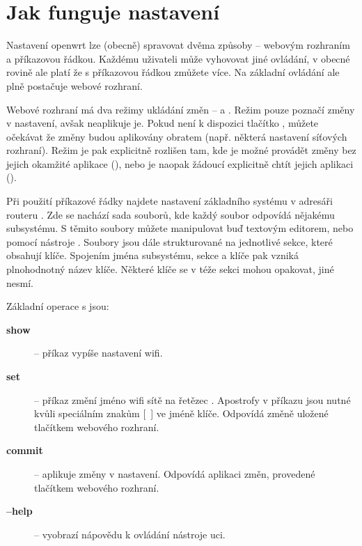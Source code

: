 \section{Jak funguje nastavení}
Nastavení \gls{openwrt} lze (obecně) spravovat dvěma způsoby -- webovým
rozhraním a příkazovou řádkou. Každému uživateli může vyhovovat jiné ovládání,
v obecné rovině ale platí že s příkazovou řádkou zmůžete více. Na základní
ovládání ale plně postačuje webové rozhraní.

Webové rozhraní má dva režimy ukládání změn --  a .
Režim  pouze poznačí změny v nastavení, avšak neaplikuje je. Pokud
není k dispozici tlačítko , můžete očekávat že změny budou
aplikovány obratem (např. některá nastavení síťových rozhraní). Režim
 je pak explicitně rozlišen tam, kde je možné provádět změny
bez jejich okamžité aplikace (), nebo je naopak žádoucí explicitně
chtít jejich aplikaci ().

Při použití příkazové řádky najdete nastavení základního systému v adresáři
routeru .
Zde se nachází sada souborů, kde každý soubor odpovídá nějakému subsystému.
S těmito soubory můžete manipulovat buď textovým editorem, nebo pomocí nástroje
. Soubory jsou dále strukturované na jednotlivé sekce, které obsahují
klíče. Spojením jména subsystému, sekce a klíče pak vzniká plnohodnotný
název klíče. Některé klíče se v téže sekci mohou opakovat, jiné nesmí.

Základní operace s  jsou:
\begin{description}
\item[\textbf{show}] -- příkaz  vypíše nastavení wifi.
\item[\textbf{set}] -- příkaz 
změní jméno wifi sítě na řetězec . Apostrofy v příkazu jsou nutné
kvůli speciálním znakům [~] ve jméně klíče. Odpovídá změně uložené tlačítkem
 webového rozhraní.
\item[\textbf{commit}] -- aplikuje změny v nastavení. Odpovídá aplikaci změn,
provedené tlačítkem  webového rozhraní.
\item[\textbf{--help}] -- vyobrazí nápovědu k ovládání nástroje uci.
\end{description}
